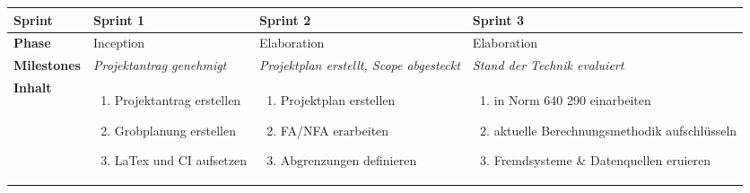 \begin{landscape}
\begin{longtable}{l p{6.5cm} p{6.5cm} p{6.5cm}}
        \toprule
        \textbf{Sprint}
                                & \textbf{Sprint 1}
                                & \textbf{Sprint 2}
                                & \textbf{Sprint 3} \\

        \midrule
        \textbf{Phase}
                                & Inception
                                & Elaboration
                                & Elaboration \\

        \textbf{Milestones}
                                & \textit{Projektantrag genehmigt}
                                & \textit{Projektplan erstellt, Scope abgesteckt}
                                & \textit{Stand der Technik evaluiert}  \\

        \textbf{Inhalt}
                                & \begin{enumerate}[noitemsep]
                                    \item Projektantrag erstellen
                                    \item Grobplanung erstellen
                                    \item LaTex und CI aufsetzen
                                \end{enumerate}
                                & \begin{enumerate}[noitemsep]
                                    \item Projektplan erstellen
                                    \item FA/NFA erarbeiten
                                    \item Abgrenzungen definieren
                                \end{enumerate}
                                & \begin{enumerate}[noitemsep]
                                    \item in Norm 640 290 einarbeiten
                                    \item aktuelle Berechnungsmethodik aufschlüsseln
                                    \item Fremdsysteme \& Datenquellen eruieren
                                \end{enumerate}\\


\end{longtable}
\end{landscape}
